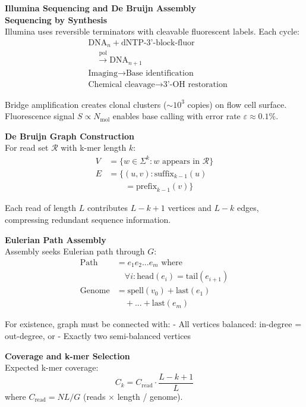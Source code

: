 \begin{technical}
{\Large\textbf{Illumina Sequencing and De Bruijn Assembly}}\\[0.7em]

\textbf{Sequencing by Synthesis}\\[0.5em]
Illumina uses reversible terminators with cleavable fluorescent labels. Each cycle:
\begin{align}
&\text{DNA}_n + \text{dNTP-3'-block-fluor}\\
&\quad\xrightarrow{\text{pol}} \text{DNA}_{n+1}\\
&\text{Imaging} \rightarrow \text{Base identification}\\
&\text{Chemical cleavage} \rightarrow \text{3'-OH restoration}
\end{align}

Bridge amplification creates clonal clusters ($\sim10^3$ copies) on flow cell surface. Fluorescence signal $S \propto N_{\text{mol}}$ enables base calling with error rate $\varepsilon \approx 0.1\%$.

\textbf{De Bruijn Graph Construction}\\[0.5em]
For read set $\mathcal{R}$ with k-mer length $k$:
\begin{align}
V &= \{w \in \Sigma^k : w \text{ appears in } \mathcal{R}\}\\
E &= \{(u,v) : \text{suffix}_{k-1}(u)\\
&\quad\quad = \text{prefix}_{k-1}(v)\}
\end{align}

Each read of length $L$ contributes $L-k+1$ vertices and $L-k$ edges, compressing redundant sequence information.

\textbf{Eulerian Path Assembly}\\[0.5em]
Assembly seeks Eulerian path through $G$:
\begin{align}
\text{Path} &= e_1e_2...e_m \text{ where}\\
&\quad \forall i: \text{head}(e_i) = \text{tail}(e_{i+1})\\
\text{Genome} &= \text{spell}(v_0) + \text{last}(e_1)\\
&\quad + ... + \text{last}(e_m)
\end{align}

For existence, graph must be connected with:
- All vertices balanced: in-degree = out-degree, or
- Exactly two semi-balanced vertices

\textbf{Coverage and k-mer Selection}\\[0.5em]
Expected k-mer coverage:
\[C_k = C_{\text{read}} \cdot \frac{L-k+1}{L}\]
where $C_{\text{read}} = NL/G$ (reads $\times$ length / genome).


\end{technical}
